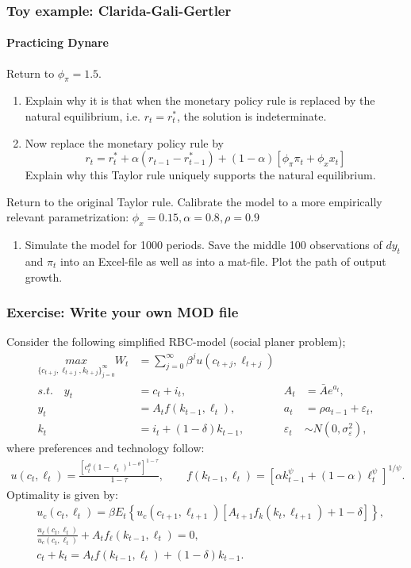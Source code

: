 \documentclass[handout]{beamer}  %
\newcounter{saveenumi}
\newcommand{\seti}{\setcounter{saveenumi}{\value{enumi}}}
\newcommand{\conti}{\setcounter{enumi}{\value{saveenumi}}}
\begin{document}
\begin{frame}\frametitle{Toy example: Clarida-Gali-Gertler}\framesubtitle{Practicing Dynare}
Return to $\phi_\pi=1.5$.
\begin{enumerate}\conti
  \item Explain why it is that when the monetary policy rule is replaced by the natural equilibrium, i.e. $r_t =r_t^*$, the solution is indeterminate.
  \item Now replace the monetary policy rule by
  \begin{equation*} r_{t} = r_t^{\ast} + \alpha (r_{t-1}-r^\ast_{t-1})+(1-\alpha )\left[ \phi _{\pi }\pi _{t}+\phi _{x}x_{t}\right]\end{equation*}
  Explain why this Taylor rule uniquely supports the natural equilibrium.\seti
\end{enumerate}
Return to the original Taylor rule. Calibrate the model to a more empirically relevant parametrization: $\phi_x=0.15,\alpha=0.8,\rho=0.9$
\begin{enumerate}\conti
   \item Simulate the model for 1000 periods. Save the middle 100 observations of $dy_t$ and $\pi_t$ into an Excel-file as well as into a mat-file. Plot the path of output growth.
\seti\end{enumerate}
\end{frame}


\begin{frame}\frametitle{Exercise: Write your own MOD file}
	Consider the following simplified RBC-model (social planer problem);
	\begin{align*}
		\underset{\{c_{t+j},\ell_{t+j},k_{t+j}\}_{j=0}^\infty}{max} W_t &= \sum_{j=0}^\infty \beta^j u(c_{t+j},\ell_{t+j})\\
		s.t.\quad y_t &= c_t + i_t, & A_t &= \bar{A}e^{a_t}, \\
		y_t &= A_t f(k_{t-1},\ell_t), & a_t &= \rho a_{t-1} + \varepsilon_t,\\
		k_t &= i_t +(1-\delta)k_{t-1}, &  \varepsilon_t &\sim N(0,\sigma_{\varepsilon}^2),
	\end{align*}
	where preferences and technology follow:
	\begin{align*}
		u(c_t,\ell_t)= \frac{\left[c_t^\theta (1-\ell_t)^{1-\theta}\right]^{1-\tau}}{1-\tau}, \qquad f(k_{t-1},\ell_t)=\left[\alpha k_{t-1}^\psi + (1-\alpha)\ell_t^\psi\right]^{1/\psi}.
	\end{align*}
	Optimality is given by:
	\begin{eqnarray*}
		&u_c(c_t,\ell_t) = \beta E_t \left\{u_c(c_{t+1},\ell_{t+1}) \left[A_{t+1} f_k(k_t, \ell_{t+1})+1-\delta \right]\right\},\\
		& \frac{u_\ell(c_t,\ell_t)}{u_c(c_t,\ell_t)}+A_t f_\ell(k_{t-1},\ell_t)=0,\\
		& c_t + k_t = A_t f(k_{t-1},\ell_t) +(1-\delta)k_{t-1}.
	\end{eqnarray*}
\end{frame}
\end{document}
